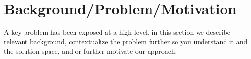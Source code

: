 \section{Background/Problem/Motivation}

  A key problem has been exposed at a high level, in this
  section we describe relevant background, contextualize the
  problem further so you understand it and the solution
  space, and or further motivate our approach.

